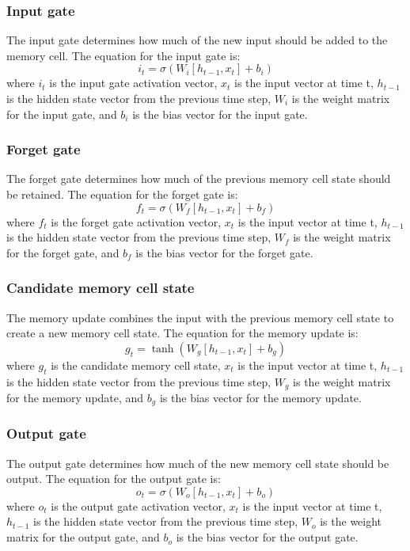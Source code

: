 \documentclass[a4paper]{sapthesis}
\begin{document}
\subsubsection{Input gate}
The input gate determines how much of the new input should be added to the 
memory cell. The equation for the input gate is:
\begin{equation}
  i_t = \sigma(W_i [h_{t-1}, x_t] + b_i)
  \end{equation}
where $i_t$ is the input gate activation vector, $x_t$ is the input vector 
at time t, $h_{t-1}$ is the hidden state vector from the previous time 
step, $W_i$ is the weight matrix for the input gate, and $b_i$ is the bias 
vector for the input gate.
\subsubsection{Forget gate}
The forget gate determines how much of the previous memory cell state 
should be retained. The equation for the forget gate is:
\begin{equation}
  f_t = \sigma(W_f [h_{t-1}, x_t] + b_f)
  \end{equation}
where $f_t$ is the forget gate activation vector, $x_t$ is the input 
vector at time t, $h_{t-1}$ is the hidden state vector from the previous time
 step, $W_f$ is the weight matrix for the forget gate, and $b_f$ is the bias 
 vector for the forget gate.
\subsubsection{Candidate memory cell state}
The memory update combines the input with the previous memory cell
 state to create a new memory cell state. The equation for the
  memory update is:
  \begin{equation}
    g_t = \tanh(W_g [h_{t-1}, x_t] + b_g)
    \end{equation}
where $g_t$ is the candidate memory cell state, $x_t$ is the input vector 
at time t, $h_{t-1}$ is the hidden state vector from the previous time step,
 $W_g$ is the weight matrix for the memory update, and $b_g$ is the bias vector
  for the memory update.
\subsubsection{Output gate}
The output gate determines how much of the new memory cell state should be 
output. The equation for the output gate is:
\begin{equation}
  o_t = \sigma(W_o [h_{t-1}, x_t] + b_o)
  \end{equation}
where $o_t$ is the output gate activation vector, $x_t$ is the input vector
 at time t, $h_{t-1}$ is the hidden state vector from the previous time step,
  $W_o$ is the weight matrix for the output gate, and $b_o$ is the bias vector 
  for the output gate.
\end{document}
